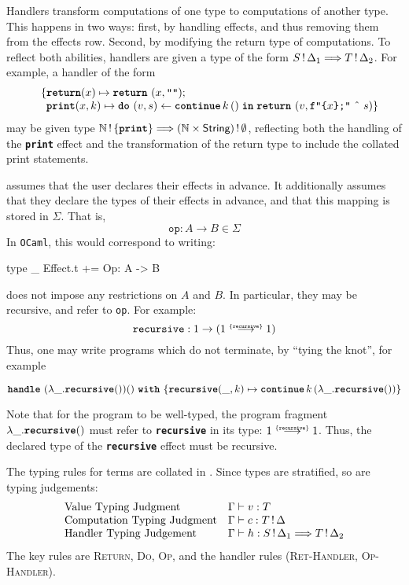 Handlers transform computations of one type to computations of another type. This happens in two ways: first, by handling effects, and thus removing them from the effects row. Second, by modifying the return type of computations. To reflect both abilities, handlers are given a type of the form $\handlerType{\effectType[\Delta_1]{S}}{\effectType[\Delta_2]{T}}$. For example, a handler of the form  
\[ \begin{array}{ll}
  \quad \{ \textbf{\texttt{return}}(x) \mapsto {\return{(x, \texttt{""})}}; \\
    \quad \, \,\, \textbf{\texttt{print}}(x, k) \mapsto {\bind{(v, s)}{\continue{k}{()}}{\return{(v, \texttt{f"\{$x$\};"} \text{ \^\ } s)}}}\}
  \end{array}
\]
may be given type $\handlerType{\effectType[\{ \textbf{\texttt{print}} \}]{\mathbb{N}}}{\effectType[\emptyset]{(\mathbb{N} \times \textsf{String})}}$, reflecting both the handling of the \textbf{\texttt{print}} effect and the transformation of the return type to include the collated print statements.

\efflang{} assumes that the user declares their effects in advance. It additionally assumes that they declare the types of their effects in advance, and that this mapping is stored in $\Sigma$. That is, 
\[\texttt{op}: A \to B \in \Sigma \]
In \texttt{OCaml}, this would correspond to writing:
\begin{ocaml}
type _ Effect.t += Op: A -> B
\end{ocaml}
\efflang{} does not impose any restrictions on $A$ and $B$. In particular, they may be recursive, and refer to \texttt{op}. For example:
\[\texttt{recursive}: 1 \to (\functionType[\{ \texttt{recursive} \}]{1}{1})\]
Thus, one may write programs which do not terminate, by ``tying the knot'', for example 
\begin{eff}
  $\handleWith{(\lambda \_ . \textbf{\texttt{recursive}} ()) ()}{\textbf{\texttt{recursive}}(\_, k) \mapsto {\continue{k}{(\lambda \_. \textbf{\texttt{recursive}} ())}}}$
\end{eff}
Note that for the program to be well-typed, the program fragment $\lambda \_. \textbf{\texttt{recursive}} ()$ must refer to \textbf{\texttt{recursive}} in its type: $\functionType[\{ \texttt{recursive} \}]{1}{1}$. Thus, the declared type of the \textbf{\texttt{recursive}} effect must be recursive. 

The typing rules for terms are collated in . Since types are stratified, so are typing judgements:
\[
\begin{array}{ll}
  \text{Value Typing Judgment} & \Gamma \vdash v: T  \\
  \text{Computation Typing Judgment} & \Gamma \vdash c: \effectType{T}  \\
  \text{Handler Typing Judgement} & \Gamma \vdash h: \handlerType{\effectType[\Delta_1]{S}}{\effectType[\Delta_2]{T}} 
\end{array}
\]
The key rules are \textsc{Return}, \textsc{Do}, \textsc{Op}, and the handler rules (\textsc{Ret-Handler}, \textsc{Op-Handler}).

